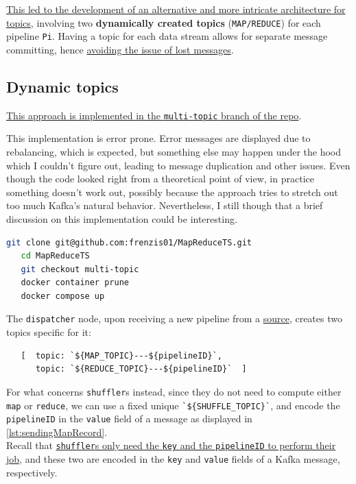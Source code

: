 
\ul{This led to the development of an alternative and more intricate architecture for topics}, involving two \textbf{dynamically created topics} (\lstinline|MAP/REDUCE|) for each pipeline \lstinline|Pi|.
Having a topic for each data stream allows for separate message committing, hence \ul{avoiding the issue of lost messages}.

\subsection{Dynamic topics}
\ul{This approach is implemented in the \texttt{multi-topic} branch of the repo}.

This implementation is error prone. Error messages are displayed due to rebalancing, which is expected, but something else may happen under the hood which I couldn't figure out, leading to message duplication and other issues.
Even though the code looked right from a theoretical point of view, in practice something doesn't work out, possibly because the approach tries to stretch out too much Kafka's natural behavior. Nevertheless, I still though that a brief discussion on this implementation could be interesting.  

\begin{lstlisting}[language=bash, caption={Testing the dynamic topics implementation. The execution may halt or display other errors.}]
   git clone git@github.com:frenzis01/MapReduceTS.git
   cd MapReduceTS
   git checkout multi-topic
   docker container prune
   docker compose up
\end{lstlisting}

The \texttt{dispatcher} node, upon receiving a new pipeline from a \ul{source}, creates two topics specific for it:
\begin{lstlisting}
   [  topic: `${MAP_TOPIC}---${pipelineID}`,
      topic: `${REDUCE_TOPIC}---${pipelineID}`  ]
\end{lstlisting}

For what concerns \texttt{shuffler}s instead, since they do not need to compute either \lstinline|map| or \lstinline|reduce|, we can use a fixed unique \lstinline|`${SHUFFLE_TOPIC}`|, and encode the \lstinline|pipelineID| in the \lstinline{value} field of a message as displayed in \ref{lst:sendingMapRecord}.\\
Recall that \ul{\texttt{shuffler}s only need the \texttt{key} and the \texttt{pipelineID} to perform their job}, and these two are encoded in the \lstinline|key| and \lstinline|value| fields of a Kafka message, respectively. 

